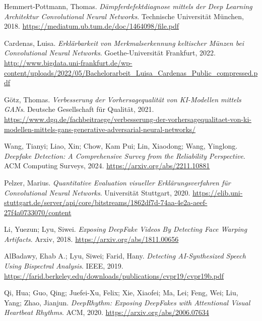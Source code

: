 \documentclass[a4paper,12pt]{article}
\begin{document}
\begin{thebibliography}{9}

Hemmert-Pottmann, Thomas. 
\textit{Dämpferdefektdiagnose mittels der Deep Learning Architektur Convolutional Neural Networks}.
Technische Universität München, 2018.
\url{https://mediatum.ub.tum.de/doc/1464098/file.pdf}

Cardenas, Luisa. 
\textit{Erklärbarkeit von Merkmalserkennung keltischer Münzen bei Convolutional Neural Networks}.
Goethe-Universität Frankfurt, 2022.
\url{http://www.bigdata.uni-frankfurt.de/wp-content/uploads/2022/05/Bachelorarbeit_Luisa_Cardenas_Public_compressed.pdf}

Götz, Thomas. 
\textit{Verbesserung der Vorhersagequalität von KI-Modellen mittels GANs}.
Deutsche Gesellschaft für Qualität, 2021.
\url{https://www.dgq.de/fachbeitraege/verbesserung-der-vorhersagequalitaet-von-ki-modellen-mittels-gans-generative-adversarial-neural-networks/}

Wang, Tianyi; Liao, Xin; Chow, Kam Pui; Lin, Xiaodong; Wang, Yinglong.
\textit{Deepfake Detection: A Comprehensive Survey from the Reliability Perspective}.
ACM Computing Surveys, 2024.
\url{https://arxiv.org/abs/2211.10881}

Pelzer, Marius.
\textit{Quantitative Evaluation visueller Erklärungsverfahren für Convolutional Neural Networks}.
Universität Stuttgart, 2020.
\url{https://elib.uni-stuttgart.de/server/api/core/bitstreams/1862df7d-74aa-4e2a-aeef-27f4a0733070/content}

Li, Yuezun; Lyu, Siwei.
\textit{Exposing DeepFake Videos By Detecting Face Warping Artifacts}.
Arxiv, 2018.
\url{https://arxiv.org/abs/1811.00656}

AlBadawy, Ehab A.; Lyu, Siwei; Farid, Hany.
\textit{Detecting AI-Synthesized Speech Using Bispectral Analysis}.
IEEE, 2019.
\url{https://farid.berkeley.edu/downloads/publications/cvpr19/cvpr19b.pdf}

Qi, Hua; Guo, Qing; Juefei-Xu, Felix; Xie, Xiaofei; Ma, Lei; Feng, Wei; Liu, Yang; Zhao, Jianjun.
\textit{DeepRhythm: Exposing DeepFakes with Attentional Visual Heartbeat Rhythms}.
ACM, 2020.
\url{https://arxiv.org/abs/2006.07634}

\end{thebibliography}
\end{document}
